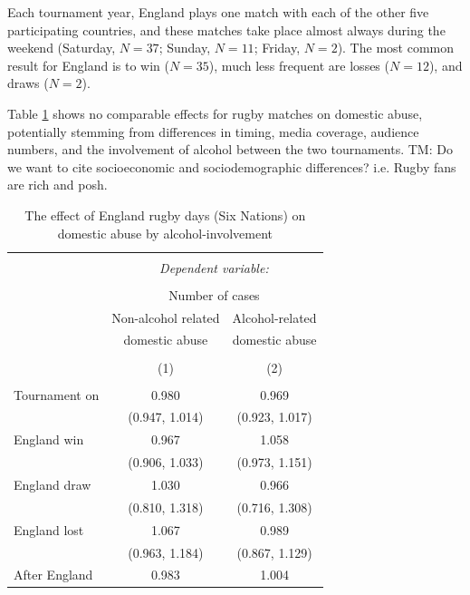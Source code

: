 \documentclass[12pt, a4paper]{article}
\newcommand{\TM}[1]{\textcolor{springgreen3}{TM: #1}}
\begin{document}
Each tournament year, England plays one match with each of the other five participating countries, and these matches take place almost always during the weekend (Saturday, $N = 37$; Sunday, $N = 11$; Friday, $N = 2$). The most common result for England is to win ($N = 35$), much less frequent are losses ($N = 12$), and draws ($N = 2$).


Table \ref{rugby} shows no comparable effects for rugby matches on domestic abuse, potentially stemming from differences in timing, media coverage, audience numbers, and the involvement of alcohol between the two tournaments. \TM{Do we want to cite socioeconomic and sociodemographic differences? i.e. Rugby fans are rich and posh.}


\begin{table}[!htbp] \centering 
  \begin{threeparttable}
  \caption{The effect of England rugby days (Six Nations) on domestic abuse by alcohol-involvement} 
  \label{rugby} 
\begin{tabular}{@{\extracolsep{5pt}}lcc} 
\\[-1.8ex]\hline 
\hline \\[-1.8ex] 
 & \multicolumn{2}{c}{\textit{Dependent variable:}} \\ 
\cline{2-3} 
\\[-1.8ex] & \multicolumn{2}{c}{Number of cases} \\ 
 & Non-alcohol related & Alcohol-related\\ 
 & domestic abuse & domestic abuse\\
\\[-1.8ex] & (1) & (2)\\ 
\hline \\[-1.8ex] 
 Tournament on & 0.980 & 0.969 \\ 
  & (0.947, 1.014) & (0.923, 1.017) \\ 
 England win & 0.967 & 1.058 \\ 
  & (0.906, 1.033) & (0.973, 1.151) \\ 
 England draw & 1.030 & 0.966 \\ 
  & (0.810, 1.318) & (0.716, 1.308) \\ 
 England lost & 1.067 & 0.989 \\ 
  & (0.963, 1.184) & (0.867, 1.129) \\ 
 After England & 0.983 & 1.004 \\ 

\end{tabular}
\end{threeparttable}
\end{table}
\end{document}
